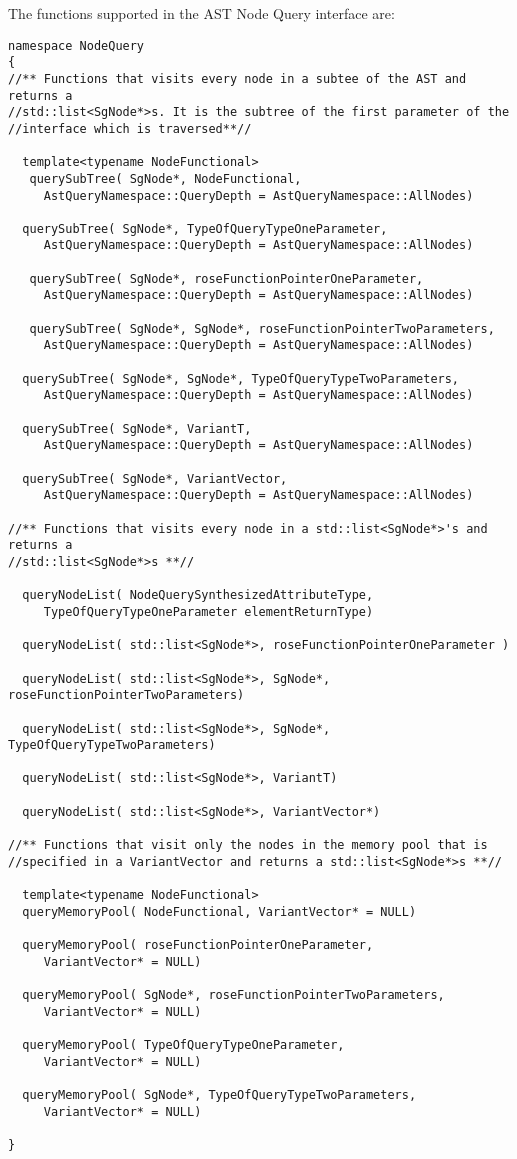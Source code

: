    The functions supported in the AST Node Query interface are:
{\mySmallestFontSize
\begin{verbatim}
namespace NodeQuery
{
//** Functions that visits every node in a subtee of the AST and returns a
//std::list<SgNode*>s. It is the subtree of the first parameter of the
//interface which is traversed**//

  template<typename NodeFunctional>
   querySubTree( SgNode*, NodeFunctional, 
     AstQueryNamespace::QueryDepth = AstQueryNamespace::AllNodes)

  querySubTree( SgNode*, TypeOfQueryTypeOneParameter,
     AstQueryNamespace::QueryDepth = AstQueryNamespace::AllNodes)

   querySubTree( SgNode*, roseFunctionPointerOneParameter,
     AstQueryNamespace::QueryDepth = AstQueryNamespace::AllNodes)

   querySubTree( SgNode*, SgNode*, roseFunctionPointerTwoParameters,
     AstQueryNamespace::QueryDepth = AstQueryNamespace::AllNodes)
  
  querySubTree( SgNode*, SgNode*, TypeOfQueryTypeTwoParameters,
     AstQueryNamespace::QueryDepth = AstQueryNamespace::AllNodes)

  querySubTree( SgNode*, VariantT,
     AstQueryNamespace::QueryDepth = AstQueryNamespace::AllNodes)
     
  querySubTree( SgNode*, VariantVector,
     AstQueryNamespace::QueryDepth = AstQueryNamespace::AllNodes)

//** Functions that visits every node in a std::list<SgNode*>'s and returns a 
//std::list<SgNode*>s **//
  
  queryNodeList( NodeQuerySynthesizedAttributeType,
     TypeOfQueryTypeOneParameter elementReturnType)

  queryNodeList( std::list<SgNode*>, roseFunctionPointerOneParameter )

  queryNodeList( std::list<SgNode*>, SgNode*, roseFunctionPointerTwoParameters)

  queryNodeList( std::list<SgNode*>, SgNode*, TypeOfQueryTypeTwoParameters)
 
  queryNodeList( std::list<SgNode*>, VariantT)

  queryNodeList( std::list<SgNode*>, VariantVector*)

//** Functions that visit only the nodes in the memory pool that is
//specified in a VariantVector and returns a std::list<SgNode*>s **// 

  template<typename NodeFunctional>
  queryMemoryPool( NodeFunctional, VariantVector* = NULL)

  queryMemoryPool( roseFunctionPointerOneParameter, 
     VariantVector* = NULL)

  queryMemoryPool( SgNode*, roseFunctionPointerTwoParameters, 
     VariantVector* = NULL)

  queryMemoryPool( TypeOfQueryTypeOneParameter,
     VariantVector* = NULL)

  queryMemoryPool( SgNode*, TypeOfQueryTypeTwoParameters,
     VariantVector* = NULL)

}
\end{verbatim}
}


